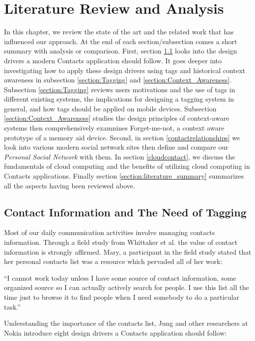 \chapter{Literature Review and Analysis}
In this chapter, we review the state of the art and the related work that has influenced our approach. At the end of each section/subsection comes a short summary with analysis or comparison. First, section \ref{contactprofile} looks into the design drivers a modern Contacts application should follow. It goes deeper into investigating how to apply these design drivers using tags and historical context awareness in subsection \ref{section:Tagging} and \ref{section:Context_Awareness}. Subsection \ref{section:Tagging} reviews users motivations and the use of tags in different existing systems, the implications for designing a tagging system in general, and how tags should be applied on mobile devices. Subsection \ref{section:Context_Awareness} studies the design principles of context-aware systems then comprehensively examnines Forget-me-not, a context aware prototype of a memory aid device. Second, in section \ref{contactrelationships} we look into various modern social network sites then define and compare our \textit{Personal Social Network} with them. In section \ref{cloudcontact}, we discuss the fundamentals of cloud computing and the benefits of utilizing cloud computing in Contacts applications. Finally section \ref{section:literature_summary} summarizes all the aspects having been reviewed above.

\section{Contact Information and The Need of Tagging}\label{contactprofile}
Most of our daily communication activities involve managing contacts information. Through a field study from Whittaker et al. \cite{Whittaker2002} the value of contact information is strongly affirmed. Mary, a participant in the field study stated that her personal contacts list was a resource which pervaded all of her work:

``I cannot work today unless I have some source of contact information, some organized source so I can actually actively search for people. I use this list all the time just to browse it to find people when I need somebody to do a particular task.''\cite{Whittaker2002}

Understanding the importance of the contacts list, Jung and other researchers at Nokia \cite{Jung2008} introduce eight design drivers a Contacts application should follow:

